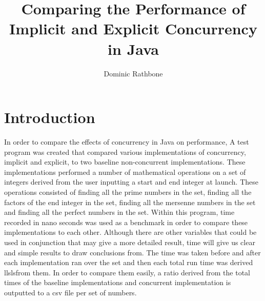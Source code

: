 \documentclass[]{report}
\title{Comparing the Performance of Implicit and Explicit Concurrency in Java}
\author{Dominic Rathbone}
\begin{document}
\maketitle

\chapter{Introduction}
In order to compare the effects of concurrency in Java on performance, A test program was created that compared various implementations of concurrency, implicit and explicit, to two baseline non-concurrent implementations. These implementations performed a number of mathematical operations on a set of integers derived from the user inputting a start and end integer at launch. These operations consisted of finding all the prime numbers in the set, finding all the factors of the end integer in the set, finding all the mersenne numbers in the set and finding all the perfect numbers in the set. Within this program, time recorded in nano seconds was used as a benchmark in order to compare these implementations to each other. Although there are other variables that could be used in conjunction that may give a more detailed result, time will give us clear and simple results to draw conclusions from. The time was taken before and after each implementation ran over the set and then each total run time was derived llslsfrom them. In order to compare them easily, a ratio derived from the total times of the baseline implementations and concurrent implementation is outputted to a csv file per set of numbers. 
\end{document}
